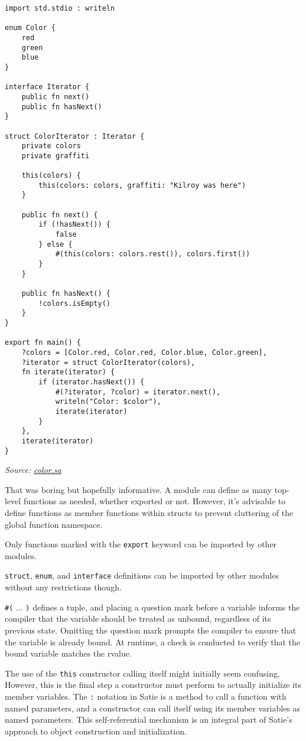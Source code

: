 \begin{verbatim}
import std.stdio : writeln

enum Color {
    red
    green
    blue
}

interface Iterator {
    public fn next()
    public fn hasNext()
}

struct ColorIterator : Iterator {
    private colors
    private graffiti

    this(colors) {
        this(colors: colors, graffiti: "Kilroy was here")
    }

    public fn next() {
        if (!hasNext()) {
            false
        } else {
            #(this(colors: colors.rest()), colors.first())
        }
    }

    public fn hasNext() {
        !colors.isEmpty()
    }
}

export fn main() {
    ?colors = [Color.red, Color.red, Color.blue, Color.green],
    ?iterator = struct ColorIterator(colors),
    fn iterate(iterator) {
        if (iterator.hasNext()) {
            #(?iterator, ?color) = iterator.next(),
            writeln("Color: $color"),
            iterate(iterator)
        }
    },
    iterate(iterator)
}
\end{verbatim}

\emph{Source: \href{../grammar/color.sa}{color.sa}}

That was boring but hopefully informative. A module can define as many
top-level functions as needed, whether exported or not. However, it's
advisable to define functions as member functions within structs to
prevent cluttering of the global function namespace.

Only functions marked with the \texttt{export} keyword can be imported
by other modules.

\texttt{struct}, \texttt{enum}, and \texttt{interface} definitions can
be imported by other modules without any restrictions though.

\texttt{\#(} ... \texttt{)} defines a tuple, and placing a question mark
before a variable informs the compiler that the variable should be
treated as unbound, regardless of its previous state. Omitting the
question mark prompts the compiler to ensure that the variable is
already bound. At runtime, a check is conducted to verify that the bound
variable matches the rvalue.

The use of the \texttt{this} constructor calling itself might initially
seem confusing. However, this is the final step a constructor must
perform to actually initialize its member variables. The \texttt{:}
notation in Satie is a method to call a function with named parameters,
and a constructor can call itself using its member variables as named
parameters. This self-referential mechanism is an integral part of
Satie's approach to object construction and initialization.

